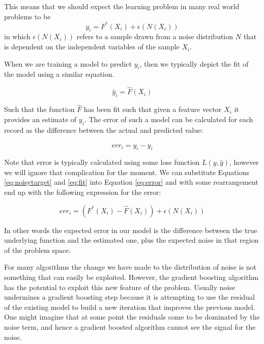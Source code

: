 \documentclass[graybox]{svmult}
\begin{document}
This means that we should expect the learning problem in many real world problems to be
%
\begin{equation}
y_i = F^*(X_i) + \epsilon(N(X_i))
\label{eq:noisytarget}
\end{equation}
%
in which $\epsilon(N(X_i))$ refers to a sample drawn from a noise distribution $N$ that is
dependent on the independent variables of the sample $X_i$.

When we are training a model to predict $y_i$, then we typically depict the fit of the model
using a similar equation.

\begin{equation}
\hat{y}_i = \hat{F}(X_i)
\label{eq:fit}
\end{equation}

Such that the function $\hat{F}$ has been fit such that given a feature vector $X_i$ it provides an estimate of $y_i$.
The error of such a model can be calculated for each record as the difference between the actual and predicted value:

\begin{equation}
err_i = y_i - \hat{y}_i
\label{eq:error}
\end{equation}

Note that error is typically calculated using some loss function $L(y,\hat{y})$, however we will ignore that complication for the moment.
We can substitute Equations \ref{eq:noisytarget} and \ref{eq:fit} into Equation \ref{eq:error} and with some rearrangement end up
with the following expression for the error:

\begin{equation}
err_i = ( F^*(X_i) - \hat{F}(X_i) )  + \epsilon(N(X_i))
\label{eq:noisyerror}
\end{equation}

In other words the expected error in our model is the difference between the true underlying function and the estimated one,
plus the expected noise in that region of the problem space.

For many algorithms the change we have made to the distribution of noise is not something that can easily be exploited.
However, the gradient boosting algorithm has the potential to exploit this new feature of the problem. Usually noise undermines
a gradient boosting step because it is attempting to use the residual of the existing model to build a new iteration that
improves the previous model. One might imagine that at some point the residuals come to be dominated by the noise term, and hence a
gradient boosted algorithm cannot see the signal for the noise.
\end{document}
